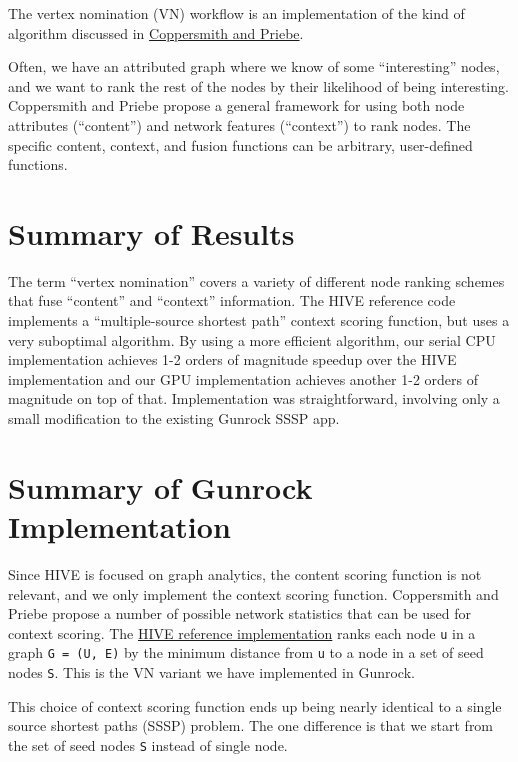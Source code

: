 \documentclass[10pt,oneside]{memoir}
\begin{document}
The vertex nomination (VN) workflow is an implementation of the kind of
algorithm discussed in
\href{https://arxiv.org/abs/1201.4118}{Coppersmith and Priebe}.

Often, we have an attributed graph where we know of some ``interesting''
nodes, and we want to rank the rest of the nodes by their likelihood of
being interesting. Coppersmith and Priebe propose a general framework
for using both node attributes (``content'') and network features
(``context'') to rank nodes. The specific content, context, and fusion
functions can be arbitrary, user-defined functions.

\hypertarget{summary-of-results-9}{%
\section{Summary of Results}\label{summary-of-results-9}}

The term ``vertex nomination'' covers a variety of different node
ranking schemes that fuse ``content'' and ``context'' information. The
HIVE reference code implements a ``multiple-source shortest path''
context scoring function, but uses a very suboptimal algorithm. By using
a more efficient algorithm, our serial CPU implementation achieves 1-2
orders of magnitude speedup over the HIVE implementation and our GPU
implementation achieves another 1-2 orders of magnitude on top of that.
Implementation was straightforward, involving only a small modification
to the existing Gunrock SSSP app.

\hypertarget{summary-of-gunrock-implementation-8}{%
\section{Summary of Gunrock
Implementation}\label{summary-of-gunrock-implementation-8}}

Since HIVE is focused on graph analytics, the content scoring function
is not relevant, and we only implement the context scoring function.
Coppersmith and Priebe propose a number of possible network statistics
that can be used for context scoring. The
\href{https://gitlab.hiveprogram.com/ggillary/vertex_nomination_Enron/blob/master/snap_vertex_nomination.py}{HIVE
reference implementation} ranks each node \texttt{u} in a graph
\texttt{G\ =\ (U,\ E)} by the minimum distance from \texttt{u} to a node
in a set of seed nodes \texttt{S}. This is the VN variant we have
implemented in Gunrock.

This choice of context scoring function ends up being nearly identical
to a single source shortest paths (SSSP) problem. The one difference is
that we start from the set of seed nodes \texttt{S} instead of single
node.
\end{document}
